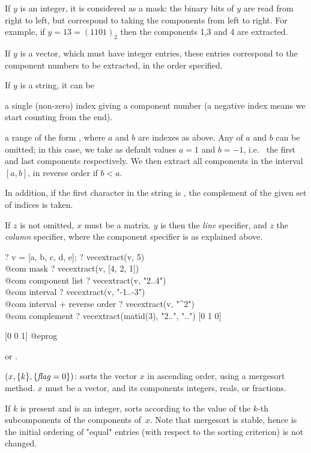 If $y$ is an integer, it is considered as a mask: the binary bits of $y$ are
read from right to left, but correspond to taking the components from left to
right. For example, if $y=13=(1101)_2$ then the components 1,3 and 4 are
extracted.

If $y$ is a vector, which must have integer entries, these entries correspond
to the component numbers to be extracted, in the order specified.

If $y$ is a string, it can be

\item a single (non-zero) index giving a component number (a negative
index means we start counting from the end).

\item a range of the form , where $a$ and $b$ are
indexes as above. Any of $a$ and $b$ can be omitted; in this case, we take
as default values $a = 1$ and $b = -1$, i.e.~ the first and last components
respectively. We then extract all components in the interval $[a,b]$, in
reverse order if $b < a$.

In addition, if the first character in the string is \kbd{\pow}, the
complement of the given set of indices is taken.

If $z$ is not omitted, $x$ must be a matrix. $y$ is then the \emph{line}
specifier, and $z$ the \emph{column} specifier, where the component specifier
is as explained above.

\bprog
? v = [a, b, c, d, e];
? vecextract(v, 5)          \\@com mask
? vecextract(v, [4, 2, 1])  \\@com component list
? vecextract(v, "2..4")     \\@com interval
? vecextract(v, "-1..-3")   \\@com interval + reverse order
? vecextract(v, "^2")       \\@com complement
? vecextract(matid(3), "2..", "..")
[0 1 0]

[0 0 1]
@eprog

 or .

$(x,\{k\},\{\hbox{\it f\kern0pt lag\/}=0\})$: sorts the vector $x$ in ascending
order, using a mergesort method. $x$ must be a vector, and its components
integers, reals, or fractions.

If $k$ is present and is an integer, sorts according to the value of the
$k$-th subcomponents of the components of~$x$. Note that mergesort is
stable, hence is the initial ordering of "equal" entries (with respect to
the sorting criterion) is not changed.

